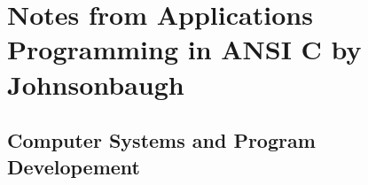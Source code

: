 \documentclass[crop=false,class=book]{standalone}
\begin{document}
\chapter{%
    Notes from Applications Programming in ANSI C by Johnsonbaugh
}
\section{Computer Systems and Program Developement}
\end{document}
